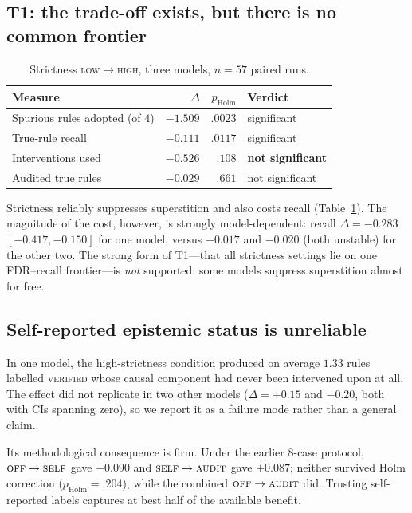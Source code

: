 \documentclass[11pt]{article}
\begin{document}
\subsection{T1: the trade-off exists, but there is no common frontier}\label{sec:t1}

\begin{table}[t]\centering
\caption{Strictness \textsc{low}$\rightarrow$\textsc{high}, three models, $n{=}57$ paired runs.}
\label{tab:t1}
\begin{tabular}{lrrl}
\toprule
Measure & $\Delta$ & $p_{\text{Holm}}$ & Verdict\\
\midrule
Spurious rules adopted (of $4$) & $-1.509$ & $.0023$ & significant\\
True-rule recall                & $-0.111$ & $.0117$ & significant\\
Interventions used              & $-0.526$ & $.108$  & \textbf{not significant}\\
Audited true rules              & $-0.029$ & $.661$  & not significant\\
\bottomrule
\end{tabular}
\end{table}

Strictness reliably suppresses superstition and also costs recall (Table~\ref{tab:t1}).
The magnitude of the cost, however, is strongly model-dependent: recall
$\Delta=-0.283$ $[-0.417,-0.150]$ for one model, versus $-0.017$ and $-0.020$ (both
unstable) for the other two. The strong form of T1---that all strictness settings lie on one
FDR--recall frontier---is \emph{not} supported: some models suppress superstition almost for
free.

\subsection{Self-reported epistemic status is unreliable}\label{sec:labels}
In one model, the high-strictness condition produced on average $1.33$ rules labelled
\textsc{verified} whose causal component had never been intervened upon at all. The effect
did not replicate in two other models ($\Delta=+0.15$ and $-0.20$, both with CIs spanning
zero), so we report it as a failure mode rather than a general claim.

Its methodological consequence is firm. Under the earlier 8-case protocol,
$\textsc{off}\rightarrow\textsc{self}$ gave $+0.090$ and
$\textsc{self}\rightarrow\textsc{audit}$ gave $+0.087$; neither survived Holm correction
($p_{\text{Holm}}=.204$), while the combined $\textsc{off}\rightarrow\textsc{audit}$ did.
Trusting self-reported labels captures at best half of the available benefit.
\end{document}
